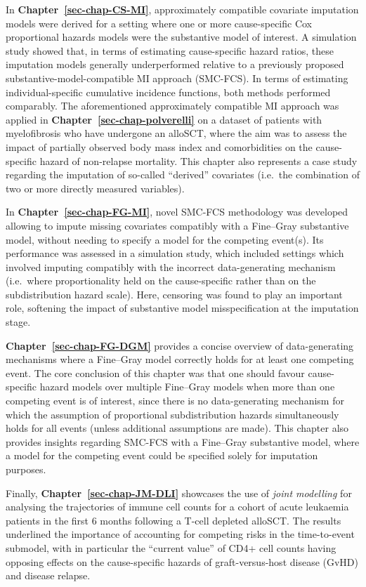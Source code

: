 \documentclass[
  letterpaper,
  paper=240mm:170mm,
  twoside=true,
  open=right,
  fontsize=10pt,
  pagesize=false,
  BCOR=15mm,
  DIV=14,
  headinclude=true,
  footinclude=false,
  headsepline=on]{scrbook}
\begin{document}
In \textbf{Chapter~\ref{sec-chap-CS-MI}}, approximately compatible
covariate imputation models were derived for a setting where one or more
cause-specific Cox proportional hazards models were the substantive
model of interest. A simulation study showed that, in terms of
estimating cause-specific hazard ratios, these imputation models
generally underperformed relative to a previously proposed
substantive-model-compatible MI approach (SMC-FCS). In terms of
estimating individual-specific cumulative incidence functions, both
methods performed comparably. The aforementioned approximately
compatible MI approach was applied in
\textbf{Chapter~\ref{sec-chap-polverelli}} on a dataset of patients with
myelofibrosis who have undergone an alloSCT, where the aim was to assess
the impact of partially observed body mass index and comorbidities on
the cause-specific hazard of non-relapse mortality. This chapter also
represents a case study regarding the imputation of so-called
``derived'' covariates (i.e.~the combination of two or more directly
measured variables).

In \textbf{Chapter~\ref{sec-chap-FG-MI}}, novel SMC-FCS methodology was
developed allowing to impute missing covariates compatibly with a
Fine--Gray substantive model, without needing to specify a model for the
competing event(s). Its performance was assessed in a simulation study,
which included settings which involved imputing compatibly with the
incorrect data-generating mechanism (i.e.~where proportionality held on
the cause-specific rather than on the subdistribution hazard scale).
Here, censoring was found to play an important role, softening the
impact of substantive model misspecification at the imputation stage.

\textbf{Chapter~\ref{sec-chap-FG-DGM}} provides a concise overview of
data-generating mechanisms where a Fine--Gray model correctly holds for
at least one competing event. The core conclusion of this chapter was
that one should favour cause-specific hazard models over multiple
Fine--Gray models when more than one competing event is of interest,
since there is no data-generating mechanism for which the assumption of
proportional subdistribution hazards simultaneously holds for all events
(unless additional assumptions are made). This chapter also provides
insights regarding SMC-FCS with a Fine--Gray substantive model, where a
model for the competing event could be specified solely for imputation
purposes.

Finally, \textbf{Chapter~\ref{sec-chap-JM-DLI}} showcases the use of
\emph{joint modelling} for analysing the trajectories of immune cell
counts for a cohort of acute leukaemia patients in the first 6 months
following a T-cell depleted alloSCT. The results underlined the
importance of accounting for competing risks in the time-to-event
submodel, with in particular the ``current value'' of CD4+ cell counts
having opposing effects on the cause-specific hazards of
graft-versus-host disease (GvHD) and disease relapse.
\end{document}
